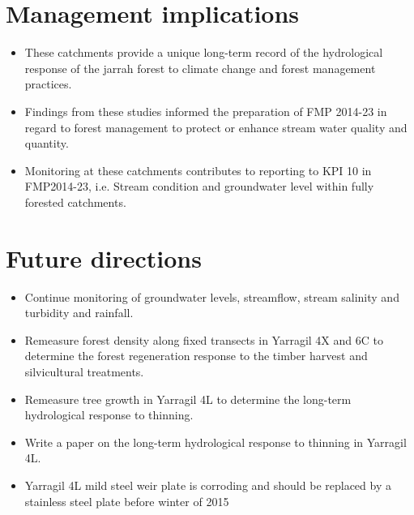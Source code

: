 \documentclass[version=last, paper=a4, DIV=18, usenames, dvipsnames]{scrartcl}
\begin{document}
\section{Management implications}



\begin{itemize}

  \item These catchments provide a unique long-term record of the hydrological response of the jarrah forest to climate change and forest management practices.

  \item Findings from these studies informed the preparation of FMP 2014-23 in regard to forest management to protect or enhance stream water quality and quantity.

  \item Monitoring at these catchments contributes to reporting to KPI 10 in FMP2014-23, i.e. Stream condition and groundwater level within fully forested catchments.

\end{itemize}






\section{Future directions}



\begin{itemize}

  \item Continue monitoring of groundwater levels, streamflow, stream salinity and turbidity and rainfall.

  \item Remeasure forest density along fixed transects in Yarragil 4X and 6C to determine the forest regeneration response to the timber harvest and silvicultural treatments.

  \item Remeasure tree growth in Yarragil 4L to determine the long-term hydrological response to thinning.

  \item Write a paper on the long-term hydrological response to thinning in Yarragil 4L.

  \item Yarragil 4L mild steel weir plate is corroding and should be replaced by a stainless steel plate before winter of 2015

\end{itemize}






\clearpage
\end{document}
